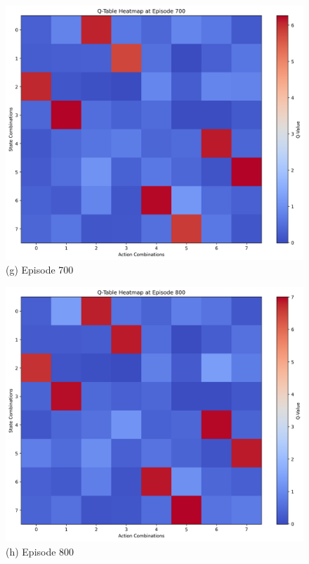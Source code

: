 \begin{figure}[htbp]
    \ContinuedFloat
    \centering
    
    \begin{minipage}{0.45\textwidth}
        \includegraphics[width=\linewidth]{figure/multi_switch/q_heatmap_episode_700.png}
        \centering (g) Episode 700
    \end{minipage}
    \hfill
    \begin{minipage}{0.45\textwidth}
        \includegraphics[width=\linewidth]{figure/multi_switch/q_heatmap_episode_800.png}
        \centering (h) Episode 800
    \end{minipage}


\end{figure}
